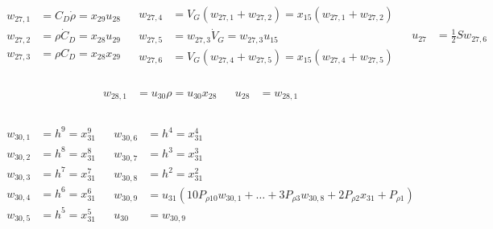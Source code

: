 \begin{align} \label{eq:u27}
\begin{split}
w_{27,1} &= C_{D}\dot{\rho} = x_{29}u_{28} \\
w_{27,2} &= \rho \dot{C}_{D} = x_{28}u_{29} \\
w_{27,3} &= \rho C_{D} = x_{28}x_{29} \\
\end{split}
&
\begin{split}
w_{27,4} &= V_{G}\left(w_{27,1}+w_{27,2}\right) = x_{15}\left(w_{27,1}+w_{27,2}\right) \\
w_{27,5} &= w_{27,3}\dot{V}_{G} = w_{27,3}u_{15} \\
w_{27,6} &= V_{G}\left(w_{27,4}+w_{27,5}\right) = x_{15}\left(w_{27,4}+w_{27,5}\right) \\
\end{split}
&
\begin{split}
u_{27} &= \frac{1}{2} S w_{27,6}\\
\end{split}
\end{align}

\begin{align} \label{eq:u28}
\begin{split}
w_{28,1} &= u_{30}\rho = u_{30}x_{28} \\
\end{split}
&
\begin{split}
u_{28} &= w_{28,1} \\
\end{split}
\end{align}

\begin{align} \label{eq:u30}
\begin{split}
w_{30,1} &= h^{9} = x_{31}^9 \\
w_{30,2} &= h^{8} = x_{31}^8 \\
w_{30,3} &= h^{7} = x_{31}^7 \\
w_{30,4} &= h^{6} = x_{31}^6 \\
w_{30,5} &= h^{5} = x_{31}^5 \\
\end{split}
&
\begin{split}
w_{30,6} &= h^{4} = x_{31}^4 \\
w_{30,7} &= h^{3} = x_{31}^3 \\
w_{30,8} &= h^{2} = x_{31}^2 \\
w_{30,9} &= u_{31}\left(10P_{\rho 10}w_{30,1}+\dots +3P_{\rho 3}w_{30,8} + 2P_{\rho 2}x_{31}+P_{\rho 1}\right) \\
\\
u_{30} &= w_{30,9} \\
\end{split}
\end{align}

